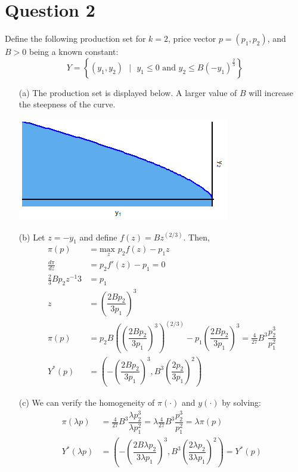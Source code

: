 \documentclass{article}
\begin{document}
\section*{Question 2}
Define the following production set for $k=2$, price vector $p=(p_1,p_2)$, and $B>0$ being a known constant:
\[
	Y=\left\{(y_1,y_2)\text{ }|\text{ }y_1\leq0\text{ and }y_2\leq B(-y_1)^{\frac{2}{3}} \right\}
\]
\begin{itemize}
	\item[(a)] The production set is displayed below. A larger value of $B$ will increase the steepness of the curve.
		\begin{center}
			\includegraphics[scale=.75]{problem2a_prodset.png}
		\end{center}
		
	\item[(b)] Let $z=-y_1$ and define $f(z)=Bz^{(2/3)}$. Then,
		\begin{align*}
			\pi(p) 						&= \underset{z}{\text{max }}p_2f(z)-p_1z	\\
			\frac{d\pi}{dz} 			&= p_2f'(z)-p_1 = 0							\\
			\frac{2}{3}Bp_2z^{-1}{3}	&= p_1										\\
			z							&= \left(\dfrac{2Bp_2}{3p_1}\right)^3		\\
			\pi(p)						&= p_2B\left(\left(\dfrac{2Bp_2}{3p_1}\right)^3\right)^{(2/3)}-p_1\left(\dfrac{2Bp_2}{3p_1}\right)^3 
										= \frac{4}{27}B^3\dfrac{p_2^3}{p_1^2}		\\
			Y^*(p)						&= \left( -\left(\dfrac{2Bp_2}{3p_1}\right)^3, B^3\left(\dfrac{2p_2}{3p_1}\right)^2 \right)
		\end{align*}
		
	\item[(c)] We can verify the homogeneity of $\pi(\cdot)$ and $y(\cdot)$ by solving:
		\begin{align*}
			\pi(\lambda p)	&= \frac{4}{27}B^3\dfrac{\lambda p_2^3}{\lambda p_1^2} = \lambda\frac{4}{27}B^3\dfrac{p_2^3}{p_1^2} = \lambda\pi(p)						\\
			Y^*(\lambda p)	&= \left( -\left(\dfrac{2B\lambda p_2}{3\lambda p_1}\right)^3, B^3\left(\dfrac{2\lambda p_2}{3 \lambda p_1}\right)^2 \right) = Y^*(p)
		\end{align*}
		

\end{itemize}
\end{document}

